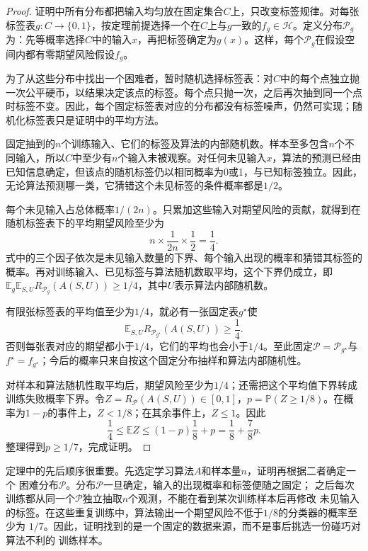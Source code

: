 \begin{proof}
证明中所有分布都把输入均匀放在固定集合$C$上，只改变标签规律。对每张标签表$g:C\to\{0,1\}$，按定理前提选择一个在$C$上与$g$一致的$f_g\in\mathcal H$。定义分布$\mathcal P_g$为：先等概率选择$C$中的输入$x$，再把标签确定为$g(x)$。这样，每个$\mathcal P_g$在假设空间内都有零期望风险假设$f_g$。

为了从这些分布中找出一个困难者，暂时随机选择标签表：对$C$中的每个点独立抛一次公平硬币，以结果决定该点的标签。每个点只抛一次，之后再次抽到同一个点时标签不变。因此，每个固定标签表对应的分布都没有标签噪声，仍然可实现；随机化标签表只是证明中的平均方法。

固定抽到的$n$个训练输入、它们的标签及算法的内部随机数。样本至多包含$n$个不同输入，所以$C$中至少有$n$个输入未被观察。对任何未见输入$x$，算法的预测已经由已知信息确定，但该点的随机标签仍以相同概率为0或1，与已知标签独立。因此，无论算法预测哪一类，它猜错这个未见标签的条件概率都是$1/2$。

每个未见输入占总体概率$1/(2n)$。只累加这些输入对期望风险的贡献，就得到在随机标签表下的平均期望风险至少为
\begin{equation}
 n\times\frac1{2n}\times\frac12=\frac14.
 \label{eq:no-free-lunch-expected-risk}
\end{equation}
式中的三个因子依次是未见输入数量的下界、每个输入出现的概率和猜错其标签的概率。再对训练输入、已见标签与算法随机数取平均，这个下界仍成立，即$\mathbb E_g\mathbb E_{S,U}R_{\mathcal P_g}(A(S,U))\geq1/4$，其中$U$表示算法内部随机数。

有限张标签表的平均值至少为$1/4$，就必有一张固定表$g^\star$使
\[
 \mathbb E_{S,U}R_{\mathcal P_{g^\star}}(A(S,U))\geq\frac14.
\]
否则每张表对应的期望都小于$1/4$，它们的平均也会小于$1/4$。至此固定$\mathcal P=\mathcal P_{g^\star}$与$f^\star=f_{g^\star}$；今后的概率只来自按这个固定分布抽样和算法内部随机性。

对样本和算法随机性取平均后，期望风险至少为$1/4$；还需把这个平均值下界转成训练失败概率下界。令$Z=R_{\mathcal P}(A(S,U))\in[0,1]$，$p=\mathbb P(Z\geq1/8)$。在概率为$1-p$的事件上，$Z<1/8$；在其余事件上，$Z\leq1$。因此
\[
 \frac14\leq\mathbb E Z\leq(1-p)\frac18+p
 =\frac18+\frac78p.
\]
整理得到$p\geq1/7$，完成证明。
\end{proof}

定理中的先后顺序很重要。先选定学习算法$A$和样本量$n$，证明再根据二者确定一个
困难分布$\mathcal P$。分布$\mathcal P$一旦确定，输入的出现概率和标签便随之固定；
之后每次训练都从同一个$\mathcal P$独立抽取$n$个观测，不能在看到某次训练样本后再修改
未见输入的标签。在这些重复训练中，算法输出一个期望风险不低于$1/8$的分类器的概率至少为
$1/7$。因此，证明找到的是一个固定的数据来源，而不是事后挑选一份碰巧对算法不利的
训练样本。

